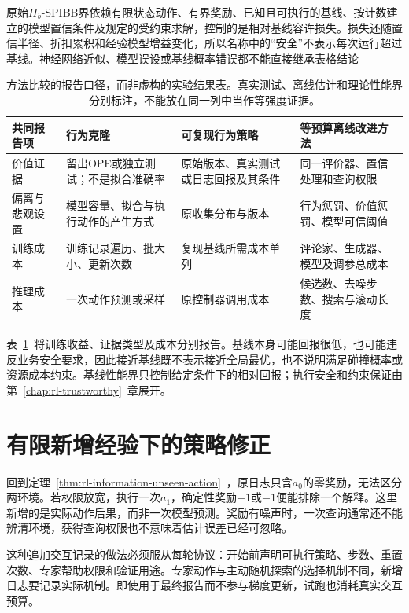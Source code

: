 原始$\Pi_b$-SPIBB界依赖有限状态动作、有界奖励、已知且可执行的基线、按计数建立的模型置信条件及规定的受约束求解，控制的是相对基线容许损失。损失还随置信半径、折扣累积和经验模型增益变化，所以名称中的“安全”不表示每次运行超过基线。神经网络近似、模型误设或基线概率错误都不能直接继承表格结论

\begin{table}[t]
  \centering
  \small
  \begin{tabularx}{\linewidth}{p{28mm}XXX}
    \toprule
    共同报告项 & 行为克隆 & 可复现行为策略 & 等预算离线改进方法 \\
    \midrule
    价值证据 & 留出OPE或独立测试；不是拟合准确率 & 原始版本、真实测试或日志回报及其条件 & 同一评价器、置信处理和查询权限 \\
    偏离与悲观设置 & 模型容量、拟合与执行动作的产生方式 & 原收集分布与版本 & 行为惩罚、价值惩罚、模型可信阈值 \\
    训练成本 & 训练记录遍历、批大小、更新次数 & 复现基线所需成本单列 & 评论家、生成器、模型及调参总成本 \\
    推理成本 & 一次动作预测或采样 & 原控制器调用成本 & 候选数、去噪步数、搜索与滚动长度 \\
    \bottomrule
  \end{tabularx}
  \caption{方法比较的报告口径，而非虚构的实验结果表。真实测试、离线估计和理论性能界分别标注，不能放在同一列中当作等强度证据。}
  \label{tab:rl-information-reporting}
\end{table}

表~\ref{tab:rl-information-reporting}~将训练收益、证据类型及成本分别报告。基线本身可能回报很低，也可能违反业务安全要求，因此接近基线既不表示接近全局最优，也不说明满足碰撞概率或资源成本约束。基线性能界只控制给定条件下的相对回报；执行安全和约束保证由第~\ref{chap:rl-trustworthy}~章展开。

\section{有限新增经验下的策略修正}
\label{sec:rl-information-limited-interaction}

回到定理~\ref{thm:rl-information-unseen-action}~，原日志只含$a_0$的零奖励，无法区分两环境。若权限放宽，执行一次$a_1$，确定性奖励$+1$或$-1$便能排除一个解释。这里新增的是实际动作后果，而非一次模型预测。奖励有噪声时，一次查询通常还不能辨清环境，获得查询权限也不意味着估计误差已经可忽略。

这种追加交互记录的做法必须服从每轮协议：开始前声明可执行策略、步数、重置次数、专家帮助权限和验证用途。专家动作与主动随机探索的选择机制不同，新增日志要记录实际机制。即使用于最终报告而不参与梯度更新，试跑也消耗真实交互预算。

